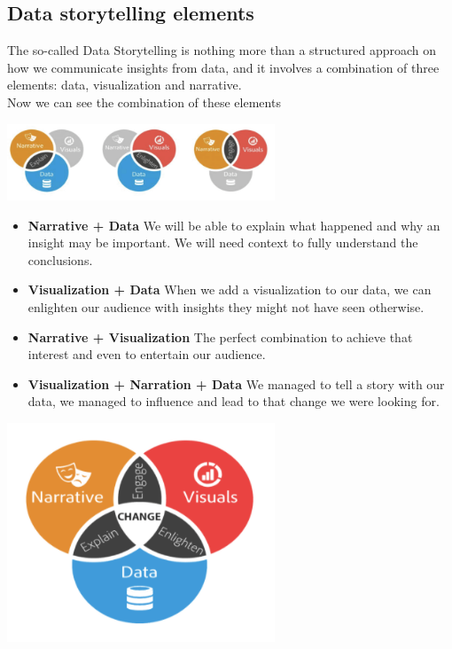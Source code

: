 \documentclass{article}
\begin{document}
\begin{multicols}{2}
\subsection{Data storytelling elements}
The so-called Data Storytelling is nothing more than a structured approach on how we communicate insights from data, and it involves a combination of three elements: data, visualization and narrative.\\
Now we can see the combination of these elements\\
\begin{center}
	\includegraphics[width=8cm]{./images/1.png} 
\end{center}
\begin{itemize}
\item \textbf{Narrative + Data}
We will be able to explain what happened and why an insight may be important. We will need context to fully understand the conclusions.
\item \textbf{Visualization + Data}
When we add a visualization to our data, we can enlighten our audience with insights they might not have seen otherwise.
\item \textbf{Narrative + Visualization}
The perfect combination to achieve that interest and even to entertain our audience.
\item \textbf{Visualization + Narration + Data}
We managed to tell a story with our data, we managed to influence and lead to that change we were looking for.
\end{itemize}
\begin{center}
	\includegraphics[width=8cm]{./images/2.png} 
\end{center}



\end{multicols}
\end{document}

